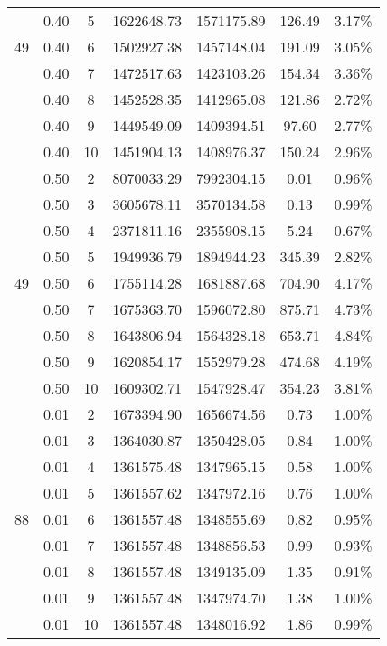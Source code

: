 {\begin{longtable}{cccrrcc}
        & 0.40  & 5     & 1622648.73 & 1571175.89 & 126.49 & 3.17\% \\
  49    & 0.40  & 6     & 1502927.38 & 1457148.04 & 191.09 & 3.05\% \\
        & 0.40  & 7     & 1472517.63 & 1423103.26 & 154.34 & 3.36\% \\
        & 0.40  & 8     & 1452528.35 & 1412965.08 & 121.86 & 2.72\% \\
        & 0.40  & 9     & 1449549.09 & 1409394.51 & 97.60 & 2.77\% \\
        & 0.40  & 10    & 1451904.13 & 1408976.37 & 150.24 & 2.96\% \\
        & 0.50  & 2     & 8070033.29 & 7992304.15 & 0.01  & 0.96\% \\
        & 0.50  & 3     & 3605678.11 & 3570134.58 & 0.13  & 0.99\% \\
        & 0.50  & 4     & 2371811.16 & 2355908.15 & 5.24  & 0.67\% \\
        & 0.50  & 5     & 1949936.79 & 1894944.23 & 345.39 & 2.82\% \\
  49    & 0.50  & 6     & 1755114.28 & 1681887.68 & 704.90 & 4.17\% \\
        & 0.50  & 7     & 1675363.70 & 1596072.80 & 875.71 & 4.73\% \\
        & 0.50  & 8     & 1643806.94 & 1564328.18 & 653.71 & 4.84\% \\
        & 0.50  & 9     & 1620854.17 & 1552979.28 & 474.68 & 4.19\% \\
        & 0.50  & 10    & 1609302.71 & 1547928.47 & 354.23 & 3.81\% \\
        \cmidrule(r){2-7}
        & 0.01  & 2     & 1673394.90 & 1656674.56 & 0.73  & 1.00\% \\
        & 0.01  & 3     & 1364030.87 & 1350428.05 & 0.84  & 1.00\% \\
        & 0.01  & 4     & 1361575.48 & 1347965.15 & 0.58  & 1.00\% \\
        & 0.01  & 5     & 1361557.62 & 1347972.16 & 0.76  & 1.00\% \\
  88    & 0.01  & 6     & 1361557.48 & 1348555.69 & 0.82  & 0.95\% \\
        & 0.01  & 7     & 1361557.48 & 1348856.53 & 0.99  & 0.93\% \\
        & 0.01  & 8     & 1361557.48 & 1349135.09 & 1.35  & 0.91\% \\
        & 0.01  & 9     & 1361557.48 & 1347974.70 & 1.38  & 1.00\% \\
        & 0.01  & 10    & 1361557.48 & 1348016.92 & 1.86  & 0.99\% \\

\end{longtable}}
